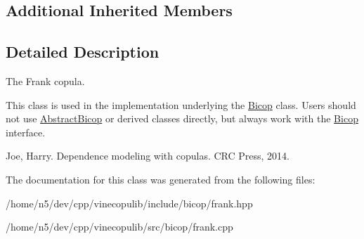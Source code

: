 \subsection*{Additional Inherited Members}


\subsection{Detailed Description}
The Frank copula. 

This class is used in the implementation underlying the \hyperlink{classvinecopulib_1_1_bicop}{Bicop} class. Users should not use \hyperlink{classvinecopulib_1_1_abstract_bicop}{Abstract\+Bicop} or derived classes directly, but always work with the \hyperlink{classvinecopulib_1_1_bicop}{Bicop} interface.

Joe, Harry. Dependence modeling with copulas. C\+RC Press, 2014. 

The documentation for this class was generated from the following files\+:\begin{DoxyCompactItemize}
\item 
/home/n5/dev/cpp/vinecopulib/include/bicop/frank.\+hpp\item 
/home/n5/dev/cpp/vinecopulib/src/bicop/frank.\+cpp\end{DoxyCompactItemize}
